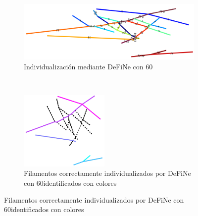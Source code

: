 \begin{figure}[h!]
    \begin{subfigure}[t]{0.49\textwidth}
        \centering
        \includegraphics[scale=0.6]{resultImages/field3-t0-2cellBcrop-filtered-DeFiNe60.png}
        \caption{Individualizaci\'on mediante DeFiNe con 60\textdegree}
        \label{fig:field3t0filtered1Results-define60}
    \end{subfigure}
    ~ 
    \begin{subfigure}[t]{0.49\textwidth}
        \centering
        \includegraphics[height=1.5in]{resultImages/field3-t0-2cellBcrop-filtered-DeFiNeExactMatch-60.png}
        \caption{Filamentos correctamente individualizados por DeFiNe con 60\textdegree identificados con colores}
        \label{fig:field3t0filtered1Results-define60Exact}
    \end{subfigure}
    

\end{figure}
